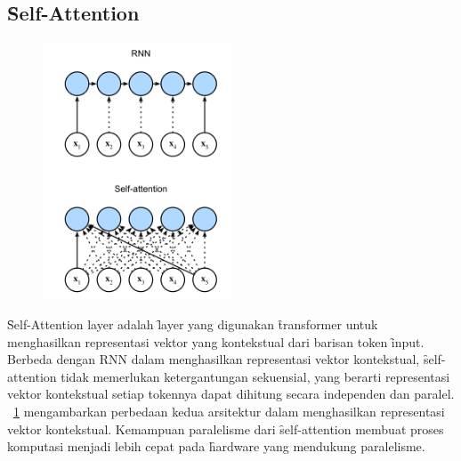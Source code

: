 	\subsection{\f{Self-Attention}}
	\begin{figure}
		\centering
		\includegraphics[width=0.5\textwidth]{assets/pics/rnn-compare-selfattention.png}
		\label{fig:self-attention-rnn}
	\end{figure}

	\f{Self-Attention layer} adalah \f{layer} yang digunakan \f{transformer} untuk menghasilkan representasi vektor yang kontekstual dari barisan token \f{input}. Berbeda dengan RNN dalam menghasilkan representasi vektor kontekstual, \f{self-attention} tidak memerlukan ketergantungan sekuensial, yang berarti representasi vektor kontekstual setiap tokennya dapat dihitung secara independen dan paralel. \pic~\ref{fig:self-attention-rnn} mengambarkan perbedaan kedua arsitektur dalam menghasilkan representasi vektor kontekstual. Kemampuan paralelisme dari \f{self-attention} membuat proses komputasi menjadi lebih cepat pada \f{hardware} yang mendukung paralelisme. 

